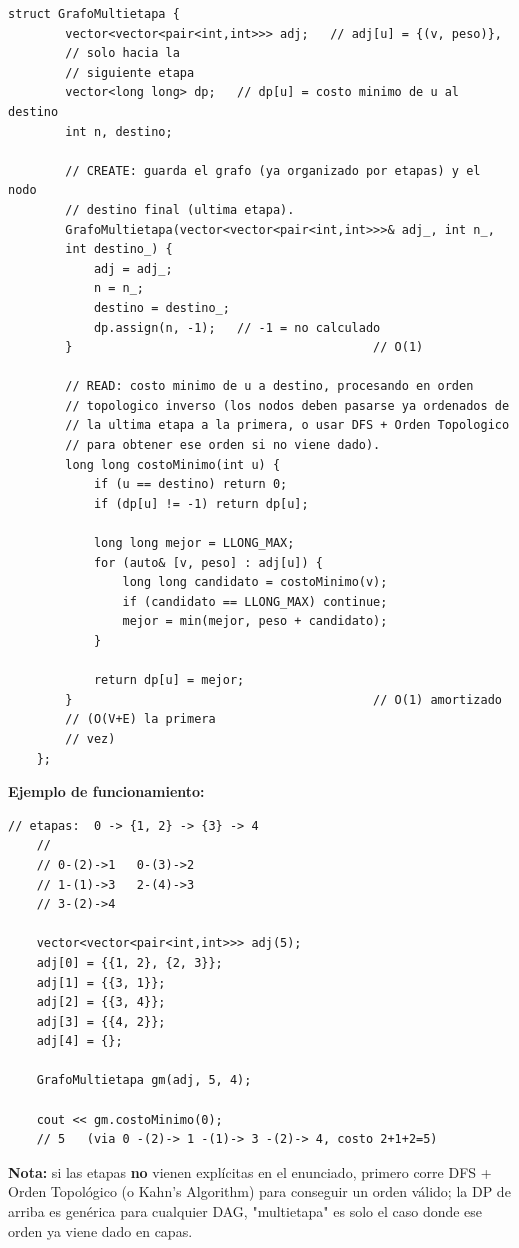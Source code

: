 \documentclass[10pt,a4paper,twocolumn]{article}
\begin{document}
\begin{lstlisting}[style=cpp]
	struct GrafoMultietapa {
		vector<vector<pair<int,int>>> adj;   // adj[u] = {(v, peso)},
		// solo hacia la
		// siguiente etapa
		vector<long long> dp;   // dp[u] = costo minimo de u al destino
		int n, destino;
		
		// CREATE: guarda el grafo (ya organizado por etapas) y el nodo
		// destino final (ultima etapa).
		GrafoMultietapa(vector<vector<pair<int,int>>>& adj_, int n_,
		int destino_) {
			adj = adj_;
			n = n_;
			destino = destino_;
			dp.assign(n, -1);   // -1 = no calculado
		}                                          // O(1)
		
		// READ: costo minimo de u a destino, procesando en orden
		// topologico inverso (los nodos deben pasarse ya ordenados de
		// la ultima etapa a la primera, o usar DFS + Orden Topologico
		// para obtener ese orden si no viene dado).
		long long costoMinimo(int u) {
			if (u == destino) return 0;
			if (dp[u] != -1) return dp[u];
			
			long long mejor = LLONG_MAX;
			for (auto& [v, peso] : adj[u]) {
				long long candidato = costoMinimo(v);
				if (candidato == LLONG_MAX) continue;
				mejor = min(mejor, peso + candidato);
			}
			
			return dp[u] = mejor;
		}                                          // O(1) amortizado
		// (O(V+E) la primera
		// vez)
	};
\end{lstlisting}

\textbf{Ejemplo de funcionamiento:}

\begin{lstlisting}[style=cpp]
	// etapas:  0 -> {1, 2} -> {3} -> 4
	//
	// 0-(2)->1   0-(3)->2
	// 1-(1)->3   2-(4)->3
	// 3-(2)->4
	
	vector<vector<pair<int,int>>> adj(5);
	adj[0] = {{1, 2}, {2, 3}};
	adj[1] = {{3, 1}};
	adj[2] = {{3, 4}};
	adj[3] = {{4, 2}};
	adj[4] = {};
	
	GrafoMultietapa gm(adj, 5, 4);
	
	cout << gm.costoMinimo(0);
	// 5   (via 0 -(2)-> 1 -(1)-> 3 -(2)-> 4, costo 2+1+2=5)
\end{lstlisting}

\textbf{Nota:} si las etapas \textbf{no} vienen explícitas en el
enunciado, primero corre DFS + Orden Topológico (o Kahn's Algorithm)
para conseguir un orden válido; la DP de arriba es genérica para
cualquier DAG, "multietapa" es solo el caso donde ese orden ya viene
dado en capas.
\end{document}
